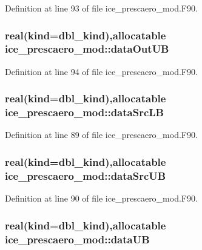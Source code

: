 Definition at line 93 of file ice\_\-prescaero\_\-mod.F90.\hypertarget{namespaceice__prescaero__mod_ad753676afac58f6bdbb0c4ad5f330c09}{
\subsubsection[{dataOutUB}]{\setlength{\rightskip}{0pt plus 5cm}real(kind=dbl\_\-kind),allocatable {\bf ice\_\-prescaero\_\-mod::dataOutUB}}}
\label{namespaceice__prescaero__mod_ad753676afac58f6bdbb0c4ad5f330c09}


Definition at line 94 of file ice\_\-prescaero\_\-mod.F90.\hypertarget{namespaceice__prescaero__mod_afbd1563a75a090ddd309cc987ea8e9e5}{
\subsubsection[{dataSrcLB}]{\setlength{\rightskip}{0pt plus 5cm}real(kind=dbl\_\-kind),allocatable {\bf ice\_\-prescaero\_\-mod::dataSrcLB}}}
\label{namespaceice__prescaero__mod_afbd1563a75a090ddd309cc987ea8e9e5}


Definition at line 89 of file ice\_\-prescaero\_\-mod.F90.\hypertarget{namespaceice__prescaero__mod_ad4ef44bba9c163d1a0cdd1f739878aff}{
\subsubsection[{dataSrcUB}]{\setlength{\rightskip}{0pt plus 5cm}real(kind=dbl\_\-kind),allocatable {\bf ice\_\-prescaero\_\-mod::dataSrcUB}}}
\label{namespaceice__prescaero__mod_ad4ef44bba9c163d1a0cdd1f739878aff}


Definition at line 90 of file ice\_\-prescaero\_\-mod.F90.\hypertarget{namespaceice__prescaero__mod_a5dc80d6924fb5d7281e3ed6a94055e43}{
\subsubsection[{dataUB}]{\setlength{\rightskip}{0pt plus 5cm}real(kind=dbl\_\-kind),allocatable {\bf ice\_\-prescaero\_\-mod::dataUB}}}
\label{namespaceice__prescaero__mod_a5dc80d6924fb5d7281e3ed6a94055e43}


